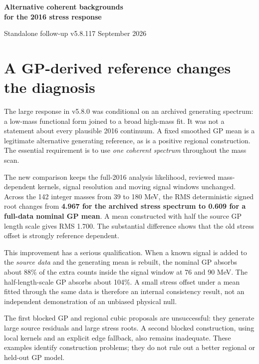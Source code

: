 \documentclass[11pt]{article}
\newcommand{\heading}[1]{\section*{\color{navy}#1}}
\begin{document}
{\LARGE\bfseries\color{navy} Alternative coherent backgrounds\\for the 2016 stress response}\par
{\large Standalone follow-up v5.8.1}\hfill 17 September 2026

\heading{A GP-derived reference changes the diagnosis}
The large response in v5.8.0 was conditional on an archived generating spectrum: a low-mass functional form joined to a broad high-mass fit. It was not a statement about every plausible 2016 continuum. A fixed smoothed GP mean is a legitimate alternative generating reference, as is a positive regional construction. The essential requirement is to use \emph{one coherent spectrum} throughout the mass scan.

The new comparison keeps the full-2016 analysis likelihood, reviewed mass-dependent kernels, signal resolution and moving signal windows unchanged. Across the 142 integer masses from 39 to 180 MeV, the RMS deterministic signed root changes from \textbf{4.967 for the archived stress spectrum to 0.609 for a full-data nominal GP mean}. A mean constructed with half the source GP length scale gives RMS 1.700. The substantial difference shows that the old stress offset is strongly reference dependent.

This improvement has a serious qualification. When a known signal is added to the \emph{source data} and the generating mean is rebuilt, the nominal GP absorbs about 88\% of the extra counts inside the signal window at 76 and 90 MeV. The half-length-scale GP absorbs about 104\%. A small stress offset under a mean fitted through the same data is therefore an internal consistency result, not an independent demonstration of an unbiased physical null.

The first blocked GP and regional cubic proposals are unsuccessful: they generate large source residuals and large stress roots. A second blocked construction, using local kernels and an explicit edge fallback, also remains inadequate. These examples identify construction problems; they do not rule out a better regional or held-out GP model.
\end{document}
